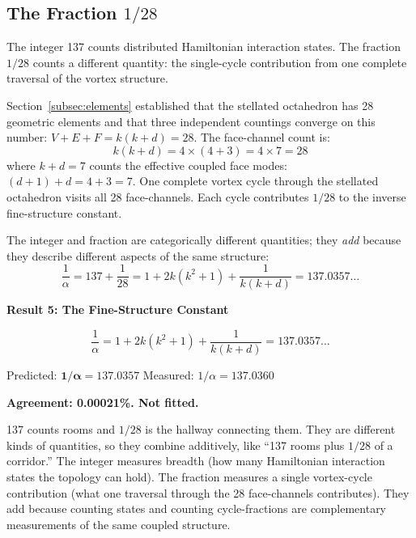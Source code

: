 \documentclass[aps,prd,preprint,superscriptaddress,showpacs,preprintnumbers,amsmath,amssymb,nofootinbib]{revtex4-2}
\begin{document}
\subsection{The Fraction $1/28$}
\label{subsec:fraction}

The integer 137 counts distributed Hamiltonian interaction states. The fraction $1/28$ counts a different quantity: the single-cycle contribution from one complete traversal of the vortex structure.

Section~\ref{subsec:elements} established that the stellated octahedron has 28 geometric elements and that three independent countings converge on this number: $V + E + F = k(k+d) = 28$. The face-channel count is:
\begin{equation}
k(k + d) = 4 \times (4 + 3) = 4 \times 7 = 28
\end{equation}
where $k + d = 7$ counts the effective coupled face modes: $(d+1) + d = 4 + 3 = 7$. One complete vortex cycle through the stellated octahedron visits all 28 face-channels. Each cycle contributes $1/28$ to the inverse fine-structure constant.

The integer and fraction are categorically different quantities; they \emph{add} because they describe different aspects of the same structure:
\begin{equation}
\frac{1}{\alpha} = 137 + \frac{1}{28} = 1 + 2k(k^2 + 1) + \frac{1}{k(k+d)} = 137.0357\ldots
\label{eq:alpha-full}
\end{equation}

\vspace{1.5em}
\noindent
\colorbox{resultgreen}{\parbox{\dimexpr\textwidth-2\fboxsep\relax}{%
\vspace{0.8em}
\centering
\textbf{\large Result 5: The Fine-Structure Constant}

\vspace{0.5em}
\boldmath
\begin{equation}
\frac{1}{\alpha} = 1 + 2k(k^2 + 1) + \frac{1}{k(k+d)} = 137.0357\ldots
\end{equation}
\unboldmath

\vspace{0.3em}
Predicted: $\bm{1/\alpha = 137.0357}$ \quad Measured: $1/\alpha = 137.0360$~\cite{codata2022}

\textbf{Agreement: 0.00021\%. Not fitted.}
\vspace{0.5em}
}}
\vspace{1cm}

137 counts rooms and $1/28$ is the hallway connecting them. They are different kinds of quantities, so they combine additively, like ``137 rooms plus $1/28$ of a corridor.'' The integer measures breadth (how many Hamiltonian interaction states the topology can hold). The fraction measures a single vortex-cycle contribution (what one traversal through the 28 face-channels contributes). They add because counting states and counting cycle-fractions are complementary measurements of the same coupled structure.
\end{document}
